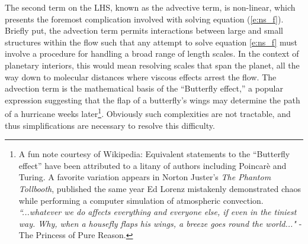 The second term on the LHS, known as the advective term, is non-linear, which presents the foremost complication involved with solving equation (\ref{e:ns_f}). 
Briefly put, the advection term permits interactions between large and small structures within the flow such that any attempt to solve equation \eqref{e:ns_f} must involve a procedure for handling a broad range of length scales. 
In the context of planetary interiors, this would mean resolving scales that span the planet, all the way down to molecular distances where viscous effects arrest the flow. 
The advection term is the mathematical basis of the ``Butterfly effect,'' a popular expression suggesting that the flap of a butterfly's wings may determine the path of a hurricane weeks later\footnote{ A fun note courtesy of Wikipedia:
	Equivalent statements to the ``Butterfly effect'' have been attributed to a litany of authors including Poincar\`e and Turing. A favorite variation appears in Norton Juster's \textit{The Phantom Tollbooth}, published the same year Ed Lorenz mistakenly demonstrated chaos while performing a computer simulation of atmospheric convection.\\ 
	\textit{``...whatever we do affects everything and everyone else, if even in the tiniest way. Why, when a housefly flaps his wings, a breeze goes round the world..."} -The Princess of Pure Reason.
}.
Obviously such complexities are not tractable, and thus simplifications are necessary to resolve this difficulty. 

